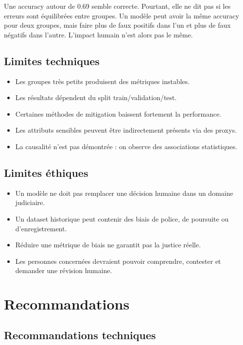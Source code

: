 \documentclass[12pt,a4paper]{report}
\begin{document}
Une accuracy autour de 0.69 semble correcte. Pourtant, elle ne dit pas si les erreurs sont équilibrées entre groupes. Un modèle peut avoir la même accuracy pour deux groupes, mais faire plus de faux positifs dans l'un et plus de faux négatifs dans l'autre. L'impact humain n'est alors pas le même.

\section{Limites techniques}

\begin{itemize}
  \item Les groupes très petits produisent des métriques instables.
  \item Les résultats dépendent du split train/validation/test.
  \item Certaines méthodes de mitigation baissent fortement la performance.
  \item Les attributs sensibles peuvent être indirectement présents via des proxys.
  \item La causalité n'est pas démontrée : on observe des associations statistiques.
\end{itemize}

\section{Limites éthiques}

\begin{itemize}
  \item Un modèle ne doit pas remplacer une décision humaine dans un domaine judiciaire.
  \item Un dataset historique peut contenir des biais de police, de poursuite ou d'enregistrement.
  \item Réduire une métrique de biais ne garantit pas la justice réelle.
  \item Les personnes concernées devraient pouvoir comprendre, contester et demander une révision humaine.
\end{itemize}

\chapter{Recommandations}

\section{Recommandations techniques}
\end{document}
